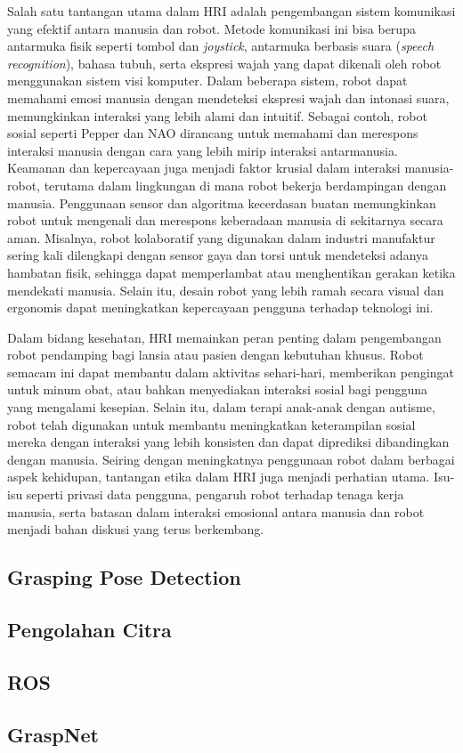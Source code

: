 Salah satu tantangan utama dalam HRI adalah pengembangan sistem komunikasi yang efektif antara manusia dan robot\parencite{QifanZhang_tlihrifamoagdwqr}.
Metode komunikasi ini bisa berupa antarmuka fisik seperti tombol dan \emph{joystick}, antarmuka berbasis suara (\emph{speech recognition}),
bahasa tubuh, serta ekspresi wajah yang dapat dikenali oleh robot menggunakan sistem visi komputer. Dalam beberapa sistem,
robot dapat memahami emosi manusia dengan mendeteksi ekspresi wajah dan intonasi suara, memungkinkan interaksi yang lebih alami dan
intuitif. Sebagai contoh, robot sosial seperti Pepper dan NAO dirancang untuk memahami dan merespons interaksi manusia dengan cara
yang lebih mirip interaksi antarmanusia. Keamanan dan kepercayaan juga menjadi faktor krusial dalam interaksi manusia-robot,
terutama dalam lingkungan di mana robot bekerja berdampingan dengan manusia. Penggunaan sensor dan algoritma kecerdasan buatan
memungkinkan robot untuk mengenali dan merespons keberadaan manusia di sekitarnya secara aman. Misalnya, robot kolaboratif yang
digunakan dalam industri manufaktur sering kali dilengkapi dengan sensor gaya dan torsi untuk mendeteksi adanya hambatan fisik,
sehingga dapat memperlambat atau menghentikan gerakan ketika mendekati manusia. Selain itu, desain robot yang lebih ramah secara
visual dan ergonomis dapat meningkatkan kepercayaan pengguna terhadap teknologi ini.  

Dalam bidang kesehatan, HRI memainkan peran penting dalam pengembangan robot pendamping bagi lansia atau pasien dengan kebutuhan khusus.
Robot semacam ini dapat membantu dalam aktivitas sehari-hari, memberikan pengingat untuk minum obat, atau bahkan menyediakan interaksi
sosial bagi pengguna yang mengalami kesepian. Selain itu, dalam terapi anak-anak dengan autisme, robot telah digunakan untuk membantu
meningkatkan keterampilan sosial mereka dengan interaksi yang lebih konsisten dan dapat diprediksi dibandingkan dengan manusia.  
Seiring dengan meningkatnya penggunaan robot dalam berbagai aspek kehidupan, tantangan etika dalam HRI juga menjadi perhatian utama.
Isu-isu seperti privasi data pengguna, pengaruh robot terhadap tenaga kerja manusia, serta batasan dalam interaksi emosional antara
manusia dan robot menjadi bahan diskusi yang terus berkembang.

\subsection{Grasping Pose Detection}

\subsection{Pengolahan Citra}

\subsection{ROS}

\subsection{GraspNet}